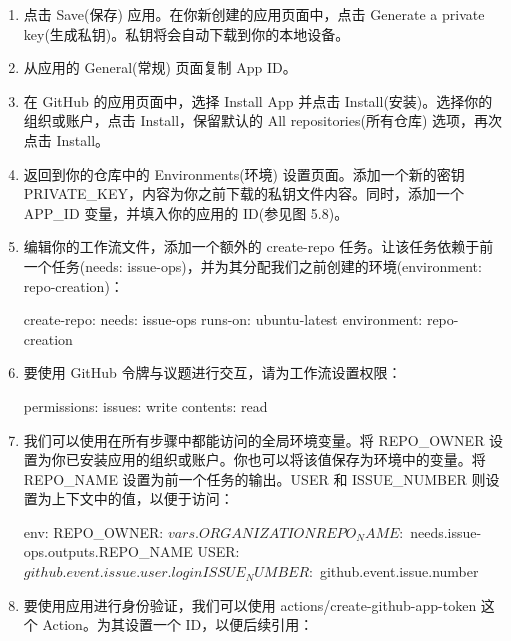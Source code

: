 \begin{enumerate}
\item 
点击 Save(保存) 应用。在你新创建的应用页面中，点击 Generate a private key(生成私钥)。私钥将会自动下载到你的本地设备。

\item 
从应用的 General(常规) 页面复制 App ID。

\item 
在 GitHub 的应用页面中，选择 Install App 并点击 Install(安装)。选择你的组织或账户，点击 Install，保留默认的 All repositories(所有仓库) 选项，再次点击 Install。

\item 
返回到你的仓库中的 Environments(环境) 设置页面。添加一个新的密钥 PRIVATE\_KEY，内容为你之前下载的私钥文件内容。同时，添加一个 APP\_ID 变量，并填入你的应用的 ID(参见图 5.8)。


\item 
编辑你的工作流文件，添加一个额外的 create-repo 任务。让该任务依赖于前一个任务(needs: issue-ops)，并为其分配我们之前创建的环境(environment: repo-creation)：

\begin{shell}
create-repo:
  needs: issue-ops
  runs-on: ubuntu-latest
  environment: repo-creation
\end{shell}

\item 
要使用 GitHub 令牌与议题进行交互，请为工作流设置权限：

\begin{shell}
  permissions:
    issues: write
    contents: read
\end{shell}

\item 
我们可以使用在所有步骤中都能访问的全局环境变量。将 REPO\_OWNER 设置为你已安装应用的组织或账户。你也可以将该值保存为环境中的变量。将 REPO\_NAME 设置为前一个任务的输出。USER 和 ISSUE\_NUMBER 则设置为上下文中的值，以便于访问：

\begin{shell}
env:
  REPO_OWNER: ${{ vars.ORGANIZATION }}
  REPO_NAME: ${{ needs.issue-ops.outputs.REPO_NAME }}
  USER: ${{ github.event.issue.user.login }}
  ISSUE_NUMBER: ${{ github.event.issue.number }}
\end{shell}

\item 
要使用应用进行身份验证，我们可以使用 actions/create-github-app-token 这个 Action。为其设置一个 ID，以便后续引用：


\end{enumerate}
